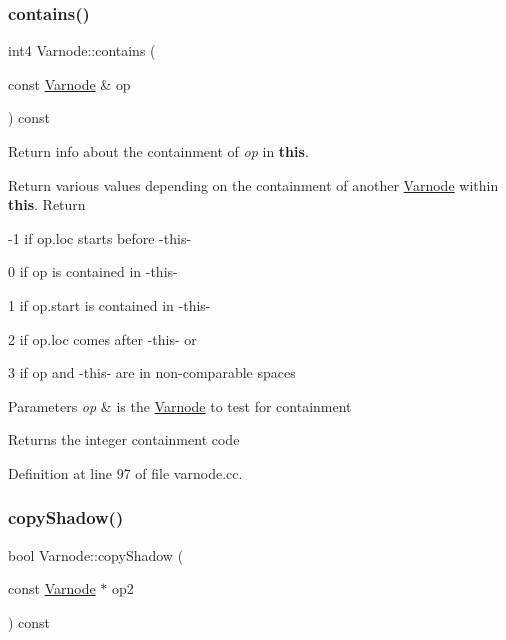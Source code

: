 \subsubsection{\texorpdfstring{contains()}{contains()}}
{\footnotesize\ttfamily int4 Varnode\+::contains (\begin{DoxyParamCaption}\item[{const \mbox{\hyperlink{class_varnode}{Varnode}} \&}]{op }\end{DoxyParamCaption}) const}



Return info about the containment of {\itshape op} in {\bfseries{this}}. 

Return various values depending on the containment of another \mbox{\hyperlink{class_varnode}{Varnode}} within {\bfseries{this}}. Return
\begin{DoxyItemize}
\item -\/1 if op.\+loc starts before -\/this-\/
\item 0 if op is contained in -\/this-\/
\item 1 if op.\+start is contained in -\/this-\/
\item 2 if op.\+loc comes after -\/this-\/ or
\item 3 if op and -\/this-\/ are in non-\/comparable spaces 
\begin{DoxyParams}{Parameters}
{\em op} & is the \mbox{\hyperlink{class_varnode}{Varnode}} to test for containment \\
\hline
\end{DoxyParams}
\begin{DoxyReturn}{Returns}
the integer containment code 
\end{DoxyReturn}

\end{DoxyItemize}

Definition at line 97 of file varnode.\+cc.

\mbox{\label{class_varnode_ad543c86a9969b04287f7c4037f5f2eac}} 
\subsubsection{\texorpdfstring{copyShadow()}{copyShadow()}}
{\footnotesize\ttfamily bool Varnode\+::copy\+Shadow (\begin{DoxyParamCaption}\item[{const \mbox{\hyperlink{class_varnode}{Varnode}} $\ast$}]{op2 }\end{DoxyParamCaption}) const}



